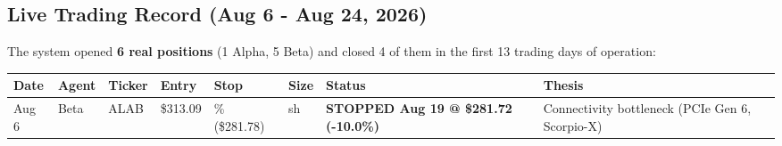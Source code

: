 \documentclass[11pt]{article}
\begin{document}
\subsection{Live Trading Record (Aug 6 - Aug 24, 2026)}\label{live-trading-record-aug-6---aug-24-2026}

The system opened \textbf{6 real positions} (1 Alpha, 5 Beta) and closed 4 of them in the first 13 trading days of operation:

{\def\LTcaptype{none} %
{\scriptsize
\begin{longtable}{@{}
  >{\raggedright\arraybackslash}p{}
  >{\raggedright\arraybackslash}p{}
  >{\raggedright\arraybackslash}p{}
  >{\raggedright\arraybackslash}p{}
  >{\raggedright\arraybackslash}p{}
  >{\raggedright\arraybackslash}p{}
  >{\raggedright\arraybackslash}p{}
  >{\raggedright\arraybackslash}p{}@{}}
\toprule\noalign{}
\begin{minipage}[b]{\linewidth}\raggedright
Date
\end{minipage} & \begin{minipage}[b]{\linewidth}\raggedright
Agent
\end{minipage} & \begin{minipage}[b]{\linewidth}\raggedright
Ticker
\end{minipage} & \begin{minipage}[b]{\linewidth}\raggedright
Entry
\end{minipage} & \begin{minipage}[b]{\linewidth}\raggedright
Stop
\end{minipage} & \begin{minipage}[b]{\linewidth}\raggedright
Size
\end{minipage} & \begin{minipage}[b]{\linewidth}\raggedright
Status
\end{minipage} & \begin{minipage}[b]{\linewidth}\raggedright
Thesis
\end{minipage} \\
\midrule\noalign{}
\endhead
\bottomrule\noalign{}
\endlastfoot
\renewcommand{\arraystretch}{1.15}
Aug 6 & Beta & ALAB & \$313.09 & -10\% (\$281.78) & 1 sh & \textbf{STOPPED Aug 19 @ \$281.72 (-10.0\%)} & Connectivity bottleneck (PCIe Gen 6, Scorpio-X) \\

\end{longtable}}}
\end{document}
